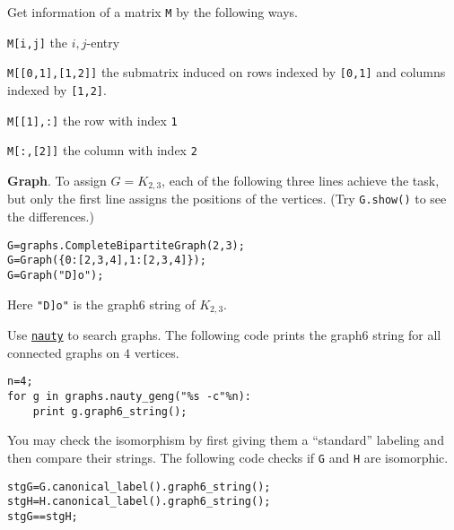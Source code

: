 \documentclass{article}
\newcommand{\heading}[1]{\medskip\textbf{#1}.}
\newenvironment{lwdes}{\begin{description}[leftmargin=1.7cm,align=left,labelwidth=1.5cm]}{\end{description}}
\begin{document}
\begin{multicols}{2}
\medskip
Get information of a matrix \texttt{M} by the following ways.
\begin{lwdes}
\item[\texttt{M[i,j]}] the $i,j$-entry
\item[\texttt{M[[0,1],[1,2]]}] the submatrix induced on rows indexed by \texttt{[0,1]} and columns indexed by \texttt{[1,2]}.
\item[\texttt{M[[1],:]}] the row with index \texttt{1}
\item[\texttt{M[:,[2]]}] the column with index \texttt{2}
\end{lwdes}
\columnbreak

\heading{Graph}  To assign $G=K_{2,3}$, each of the following three lines achieve the task, but only the first line assigns the positions of the vertices.  (Try \texttt{G.show()} to see the differences.)
\begin{obeylines}
\verb|G=graphs.CompleteBipartiteGraph(2,3);|
\verb|G=Graph({0:[2,3,4],1:[2,3,4]});|
\verb|G=Graph("D]o");|
\end{obeylines}
Here \texttt{"D]o"} is the graph6 string of $K_{2,3}$.

\medskip
Use \href{http://pallini.di.uniroma1.it/}{\texttt{nauty}} to search graphs.  The following code prints the graph6 string for all connected graphs on $4$ vertices.
\begin{verbatim}
n=4;
for g in graphs.nauty_geng("%s -c"%n):
    print g.graph6_string();
\end{verbatim}

You may check the isomorphism by first giving them a ``standard'' labeling and then compare their strings.  The following code checks if \texttt{G} and \texttt{H} are isomorphic.
\begin{verbatim}
stgG=G.canonical_label().graph6_string();
stgH=H.canonical_label().graph6_string();
stgG==stgH;
\end{verbatim}

\end{multicols}
\end{document}
